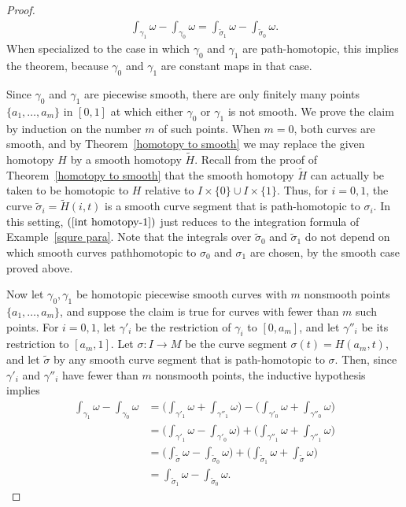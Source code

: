 \begin{proof}
\begin{align}\label{int homotopy-1}
\int_{\gamma_1}\omega-\int_{\gamma_0}\omega=\int_{\widetilde{\sigma}_1}\omega-\int_{\widetilde{\sigma}_0}\omega.
\end{align}
When specialized to the case in which $\gamma_0$ and $\gamma_1$ are path-homotopic, this implies the theorem, because $\gamma_0$ and $\gamma_1$ are constant maps in that case.\par
Since $\gamma_0$ and $\gamma_1$ are piecewise smooth, there are only finitely many points $\{a_1,\dots,a_m\}$ in $[0,1]$ at which either $\gamma_0$ or $\gamma_1$ is not smooth. We prove the claim by induction on the number $m$ of such points. When $m=0$, both curves are smooth, and by Theorem~\ref{homotopy to smooth} we may replace the given homotopy $H$ by a smooth homotopy $\widetilde{H}$. Recall from the proof of Theorem~\ref{homotopy to smooth} that the smooth homotopy $\widetilde{H}$ can actually be taken to be homotopic to $H$ relative to $I\times\{0\}\cup I\times\{1\}$. Thus, for $i=0,1$, the curve $\widetilde{\sigma}_i=\widetilde{H}(i,t)$ is a smooth curve segment that is path-homotopic to $\sigma_i$. In this setting, $(\ref{int homotopy-1})$ just reduces to the integration formula of Example~\ref{squre para}. Note that the integrals over $\widetilde{\sigma}_0$ and $\widetilde{\sigma}_1$ do not depend on which smooth curves pathhomotopic to $\sigma_0$ and $\sigma_1$ are chosen, by the smooth case proved above.\par
Now let $\gamma_0,\gamma_1$ be homotopic piecewise smooth curves with $m$ nonsmooth points $\{a_1,\dots,a_m\}$, and suppose the claim is true for curves with fewer than $m$ such points. For $i=0,1$, let $\gamma'_i$ be the restriction of $\gamma_i$ to $[0,a_m]$, and let $\gamma''_i$ be its restriction to $[a_m,1]$. Let $\sigma:I\to M$ be the curve segment $\sigma(t)=H(a_m,t)$, and let $\widetilde{\sigma}$ by any smooth curve segment that is path-homotopic to $\sigma$. Then, since $\gamma'_i$ and $\gamma''_i$ have fewer than $m$ nonsmooth points, the inductive hypothesis implies
\begin{align*}
\int_{\gamma_1}\omega-\int_{\gamma_0}\omega&=\Big(\int_{\gamma'_1}\omega+\int_{\gamma''_1}\omega\Big)-\Big(\int_{\gamma'_0}\omega+\int_{\gamma''_0}\omega\Big)\\
&=\Big(\int_{\gamma'_1}\omega-\int_{\gamma'_0}\omega\Big)+\Big(\int_{\gamma''_1}\omega+\int_{\gamma''_1}\omega\Big)\\
&=\Big(\int_{\widetilde{\sigma}}\omega-\int_{\widetilde{\sigma}_0}\omega\Big)+\Big(\int_{\widetilde{\sigma}_1}\omega+\int_{\widetilde{\sigma}}\omega\Big)\\
&=\int_{\widetilde{\sigma}_1}\omega-\int_{\widetilde{\sigma}_0}\omega.
\end{align*}
\end{proof}
